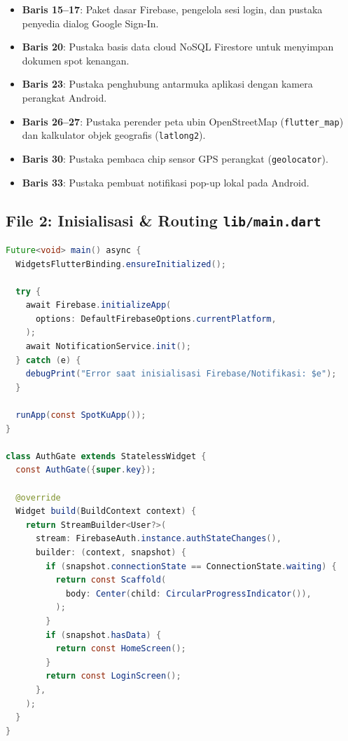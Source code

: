 \documentclass[12pt,a4paper]{article}
\begin{document}
\begin{highlightbox}
\begin{itemize}[leftmargin=*]
    \item \textbf{Baris 15--17}: Paket dasar Firebase, pengelola sesi login, dan pustaka penyedia dialog Google Sign-In.
    \item \textbf{Baris 20}: Pustaka basis data cloud NoSQL Firestore untuk menyimpan dokumen spot kenangan.
    \item \textbf{Baris 23}: Pustaka penghubung antarmuka aplikasi dengan kamera perangkat Android.
    \item \textbf{Baris 26--27}: Pustaka perender peta ubin OpenStreetMap (\texttt{flutter\_map}) dan kalkulator objek geografis (\texttt{latlong2}).
    \item \textbf{Baris 30}: Pustaka pembaca chip sensor GPS perangkat (\texttt{geolocator}).
    \item \textbf{Baris 33}: Pustaka pembuat notifikasi pop-up lokal pada Android.
\end{itemize}
\end{highlightbox}

\newpage
\subsection{File 2: Inisialisasi \& Routing \texttt{lib/main.dart}}

\begin{lstlisting}[language=Java, firstnumber=10, caption=lib/main.dart (main \& AuthGate)]
Future<void> main() async {
  WidgetsFlutterBinding.ensureInitialized();
  
  try {
    await Firebase.initializeApp(
      options: DefaultFirebaseOptions.currentPlatform,
    );
    await NotificationService.init();
  } catch (e) {
    debugPrint("Error saat inisialisasi Firebase/Notifikasi: $e");
  }
  
  runApp(const SpotKuApp());
}

class AuthGate extends StatelessWidget {
  const AuthGate({super.key});

  @override
  Widget build(BuildContext context) {
    return StreamBuilder<User?>(
      stream: FirebaseAuth.instance.authStateChanges(),
      builder: (context, snapshot) {
        if (snapshot.connectionState == ConnectionState.waiting) {
          return const Scaffold(
            body: Center(child: CircularProgressIndicator()),
          );
        }
        if (snapshot.hasData) {
          return const HomeScreen();
        }
        return const LoginScreen();
      },
    );
  }
}
\end{lstlisting}
\end{document}
